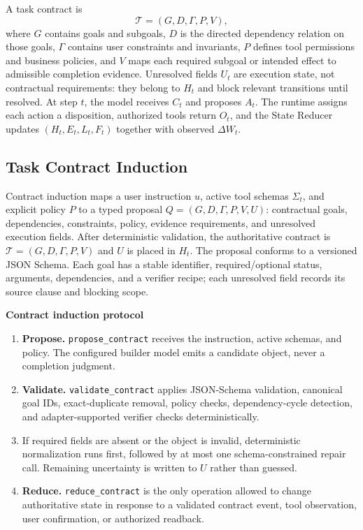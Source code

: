 \documentclass[10pt]{article}
\newcommand{\code}[1]{\texttt{#1}}
\begin{document}
A task contract is
\begin{equation}
  \mathcal{T}=(G,D,\Gamma,P,V),
\end{equation}
where $G$ contains goals and subgoals, $D$ is the directed dependency relation on
those goals, $\Gamma$ contains user constraints and invariants, $P$ defines tool
permissions and business policies, and $V$ maps each required subgoal or intended
effect to admissible completion evidence. Unresolved fields $U_t$ are execution
state, not contractual requirements: they belong to $H_t$ and block relevant
transitions until resolved. At step $t$, the model receives $C_t$ and proposes
$A_t$. The runtime assigns each action a disposition, authorized tools return
$O_t$, and the State Reducer updates $(H_t,E_t,L_t,F_t)$ together with observed
$\Delta W_t$.

\subsection{Task Contract Induction}
\label{sec:contract-induction}

Contract induction maps a user instruction $u$, active tool schemas $\Sigma_t$,
and explicit policy $P$ to a typed proposal
$Q=(G,D,\Gamma,P,V,U)$: contractual goals, dependencies, constraints, policy,
evidence requirements, and unresolved execution fields. After deterministic
validation, the authoritative contract is $\mathcal T=(G,D,\Gamma,P,V)$ and $U$
is placed in $H_t$. The proposal conforms to a versioned JSON Schema. Each goal has
a stable identifier, required/optional status, arguments, dependencies, and a
verifier recipe; each unresolved field records its source clause and blocking scope.

\begin{center}
\begin{minipage}{0.92\linewidth}
\small
\textbf{Contract induction protocol}
\begin{enumerate}
  \item \textbf{Propose.} \code{propose\_contract} receives the instruction,
        active schemas, and policy. The configured builder model emits a candidate
        object, never a completion judgment.
  \item \textbf{Validate.} \code{validate\_contract} applies JSON-Schema validation,
        canonical goal IDs, exact-duplicate removal, policy checks, dependency-cycle
        detection, and adapter-supported verifier checks deterministically.
  \item If required fields are absent or the object is invalid, deterministic
        normalization runs first, followed by at most one schema-constrained repair
        call. Remaining uncertainty is written to $U$ rather than guessed.
  \item \textbf{Reduce.} \code{reduce\_contract} is the only operation allowed to
        change authoritative state in response to a validated contract event, tool
        observation, user confirmation, or authorized readback.
\end{enumerate}
\end{minipage}
\end{center}
\end{document}
